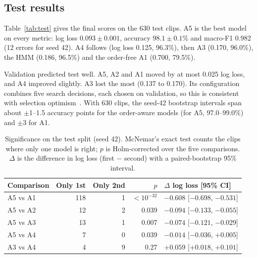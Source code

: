 \subsection{Test results}
Table~\ref{tab:test} gives the final scores on the 630 test clips. A5 is the best model on
every metric: log loss $0.093\pm0.001$, accuracy $98.1\pm0.1\%$ and macro-F1 0.982 (12 errors for seed 42). A4
follows (log loss 0.125, 96.3\%), then A3 (0.170, 96.0\%), the HMM (0.186, 96.5\%) and the order-free A1 (0.700,
79.5\%).

Validation predicted test well. A5, A2 and A1 moved by at most 0.025 log loss, and A4 improved slightly. A3 lost the
most (0.137 to 0.170). Its configuration combines five search decisions, each chosen on validation, so this is
consistent with selection optimism~\cite{cawley2010overfitting}. With 630 clips, the seed-42 bootstrap intervals
span about $\pm$1--1.5 accuracy points for the order-aware models (for A5, 97.0--99.0\%) and $\pm$3 for A1.

\begin{table}[t]
  \centering
  \caption{Test results (630 clips; mean $\pm$ SD over three seeds for A3--A5). Params counts all weights. Train is
  the final run's training time (T4 GPU for A3--A5, CPU for A1--A2). CPU ms/clip is the latency
  from audio file to probabilities on one CPU thread.}
  \label{tab:test}
  \small
  
\end{table}

\begin{table}[t]
  \centering
  \caption{Significance on the test split (seed 42). McNemar's exact test counts the clips where only one model is
  right; $p$ is Holm-corrected over the five comparisons. $\Delta$ is the difference in log loss (first $-$ second)
  with a paired-bootstrap 95\% interval.}
  \label{tab:significance}
  \footnotesize
  \setlength{\tabcolsep}{3pt}
  \begin{tabular}{@{}lrrrl@{}}
    \toprule
    Comparison & Only 1st & Only 2nd & $p$ & $\Delta$ log loss [95\% CI] \\
    \midrule
    A5 vs A1 & 118 & 1 & $<10^{-32}$ & $-0.608$ [$-0.698$, $-0.531$] \\
    A5 vs A2 & 12 & 2 & 0.039 & $-0.094$ [$-0.133$, $-0.055$] \\
    A5 vs A3 & 13 & 1 & 0.007 & $-0.074$ [$-0.121$, $-0.029$] \\
    A5 vs A4 & 7 & 0 & 0.039 & $-0.014$ [$-0.036$, $+0.005$] \\
    A3 vs A4 & 4 & 9 & 0.27 & $+0.059$ [$+0.018$, $+0.101$] \\
    \bottomrule
  \end{tabular}
\end{table}

